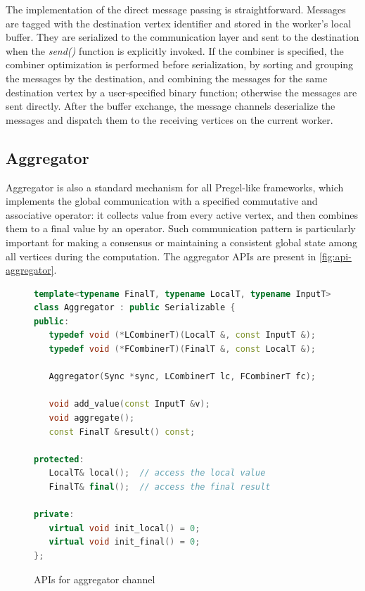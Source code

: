 \documentclass{sokendai_thesis} %
\begin{document}
The implementation of the direct message passing is straightforward.
Messages are tagged with the destination vertex identifier and stored in the worker's local buffer.
They are serialized to the communication layer and sent to the destination when the \emph{send()} function is explicitly invoked.
If the combiner is specified, the combiner optimization is performed before serialization, by sorting and grouping the messages by the destination, and combining the messages for the same destination vertex by a user-specified binary function; otherwise the messages are sent directly.
After the buffer exchange, the message channels deserialize the messages and dispatch them to the receiving vertices on the current worker.

\subsection{Aggregator}

Aggregator is also a standard mechanism for all Pregel-like frameworks, which implements the global communication with a specified commutative and associative operator: it collects value from every active vertex, and then combines them to a final value by an operator.
Such communication pattern is particularly important for making a consensus or maintaining a consistent global state among all vertices during the computation.
The aggregator APIs are present in \autoref{fig:api-aggregator}.

\begin{figure}[ht]
\centering
\vspace{-2ex}
\begin{lstlisting}[basicstyle=\small\ttfamily,numbers=none,language=c++]
template<typename FinalT, typename LocalT, typename InputT>
class Aggregator : public Serializable {
public:
   typedef void (*LCombinerT)(LocalT &, const InputT &);
   typedef void (*FCombinerT)(FinalT &, const LocalT &);

   Aggregator(Sync *sync, LCombinerT lc, FCombinerT fc);

   void add_value(const InputT &v);
   void aggregate();
   const FinalT &result() const;

protected:
   LocalT& local();  // access the local value
   FinalT& final();  // access the final result

private:
   virtual void init_local() = 0;
   virtual void init_final() = 0;
};
\end{lstlisting}
\vspace{-2ex}
\caption{APIs for aggregator channel}
\label{fig:api-aggregator}
\end{figure}
\end{document}
